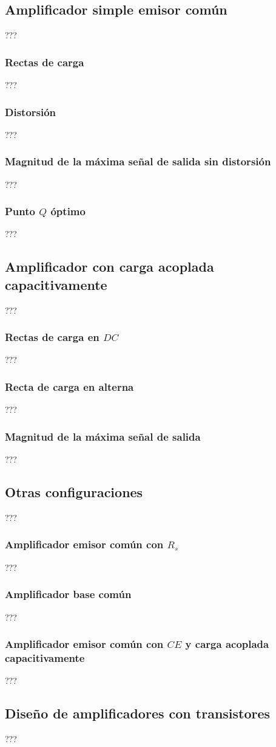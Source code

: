 \subsection{Amplificador simple emisor común}
???
\subsubsection{Rectas de carga}
???
\subsubsection{Distorsión}
???
\subsubsection{Magnitud de la máxima señal de salida sin distorsión}
???
\subsubsection{Punto $Q$ óptimo}
???
\subsection{Amplificador con carga acoplada capacitivamente}
???
\subsubsection{Rectas de carga en $DC$}
???
\subsubsection{Recta de carga en alterna}
???
\subsubsection{Magnitud de la máxima señal de salida}
???
\subsection{Otras configuraciones}
???
\subsubsection{Amplificador emisor común con $R_s$}
???
\subsubsection{Amplificador base común}
???
\subsubsection{Amplificador emisor común con $CE$ y carga acoplada capacitivamente}
???
\subsection{Diseño de amplificadores con transistores}
???